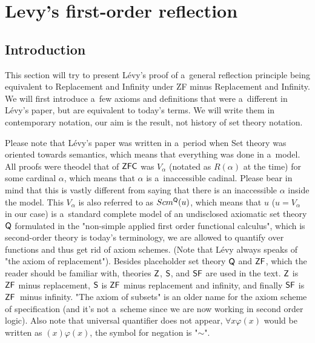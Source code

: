 \documentclass[12pt,a4paper]{article}
\begin{document}
\newpage
\section{Levy's first-order reflection}\label{sec:fixed}

\subsection{Introduction}
This section will try to present Lévy's proof of a~general reflection principle being equivalent to Replacement and Infinity under ZF minus Replacement and Infinity.
We will first introduce a~few axioms and definitions that were a~different in Lévy's paper\cite{Levy60a}, but are equivalent to today's terms. We will write them in contemporary notation, our aim is the result, not history of set theory notation. 

Please note that Lévy's paper was written in a~period when Set theory was oriented towards semantics, which means that everything was done in a~model. All proofs were theodel that of $\sf{ZFC}$ was $V_\alpha$ (notated as $R(\alpha)$ at the time) for some cardinal $\alpha$, which means that $\alpha$ is a~inaccessible cadinal. Please bear in mind that this is vastly different from saying that there is an inaccessible $\alpha$ inside the model. This $V_\alpha$ is also referred to as $Scm^{\sf{Q}}(u)$, which means that $u$ ($u=V_\alpha$ in our case) is a~standard complete model of an undisclosed axiomatic set theory $\sf{Q}$ formulated in the "non-simple applied first order functional calculus", which is second-order theory is today's terminology, we are allowed to quantify over functions and thus get rid of axiom schemes. (Note that Lévy always speaks of "the axiom of replacement"). Besides placeholder set theory $\sf{Q}$ and $\sf{ZF}$, which the reader should be familiar with, theories $\sf{Z}$, $\sf{S}$, and $\sf{SF}$ are used in the text. $\sf{Z}$ is $\sf{ZF}$ minus replacement, $\sf{S}$ is $\sf{ZF}$ minus replacement and infinity, and finally $\sf{SF}$ is $\sf{ZF}$ minus infinity. "The axiom of subsets" is an older name for the axiom scheme of specification (and it's not a~scheme since we are now working in second order logic). Also note that universal quantifier does not appear, $\forall x \varphi (x)$ would be written as $(x) \varphi (x)$, the symbol for negation is "$\sim$".

\end{document}
